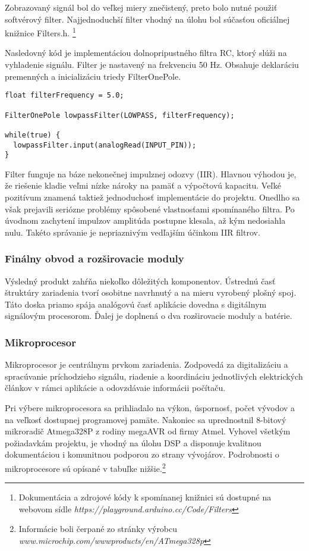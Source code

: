 \documentclass[titlepage]{article}
\begin{document}
Zobrazovaný signál bol do veľkej miery znečistený, preto bolo nutné použiť softvérový filter. Najjednoduchší filter vhodný na úlohu bol súčasťou oficiálnej knižnice Filters.h. \footnote{Dokumentácia a zdrojové kódy k spomínanej knižnici sú dostupné na webovom sídle \textit{https://playground.arduino.cc/Code/Filters}}

Nasledovný kód je implementáciou dolnopripustného filtra RC, ktorý slúži na vyhladenie signálu. Filter je nastavený na frekvenciu 50 Hz. Obsahuje deklaráciu premenných a inicializáciu triedy FilterOnePole.

\begin{lstlisting}
float filterFrequency = 5.0; 

FilterOnePole lowpassFilter(LOWPASS, filterFrequency);

while(true) {
  lowpassFilter.input(analogRead(INPUT_PIN));
}
\end{lstlisting}

Filter funguje na báze nekonečnej impulznej odozvy (IIR). Hlavnou výhodou je, že riešenie kladie veľmi nízke nároky na pamäť a výpočtovú kapacitu. Veľké pozitívum znamená taktiež jednoduchosť implementácie do projektu. Onedlho sa však prejavili seriózne problémy spôsobené vlastnosťami spomínaného filtra. Po úvodnom zachytení impulzov amplitúda postupne klesala, až kým nedosiahla nulu. Takéto správanie je nepriaznivým vedľajším účinkom IIR filtrov. 

\newpage
\subsubsection{Finálny obvod a rozširovacie moduly}
Výsledný produkt zahŕňa niekoľko dôležitých komponentov. Ústrednú časť štruktúry zariadenia tvorí osobitne navrhnutý a na mieru vyrobený plošný spoj. Táto doska priamo spája analógovú časť aplikácie dovedna s digitálnym signálovým procesorom. Ďalej je doplnená o dva rozširovacie moduly a batérie.

\subsubsection*{Mikroprocesor}
Mikroprocesor je centrálnym prvkom zariadenia. Zodpovedá za digitalizáciu a spracúvanie príchodzieho signálu, riadenie a koordináciu jednotlivých elektrických článkov v rámci aplikácie a odovzdávaie informácii počítaču.

Pri výbere mikroprocesora sa prihliadalo na výkon, úspornosť, počet vývodov a na veľkosť dostupnej programovej pamäte. Nakoniec sa uprednostnil 8-bitový mikroradič Atmega328P z rodiny megaAVR od firmy Atmel. Vyhovel všetkým požiadavkám projektu, je vhodný na úlohu DSP a disponuje kvalitnou dokumentáciou i komunitnou podporou zo strany vývojárov. 
Podrobnosti o mikroprocesore sú opísané v tabuľke nižšie.\footnote{Informácie boli čerpané zo stránky výrobcu \textit{www.microchip.com/wwwproducts/en/ATmega328p}}
\end{document}
